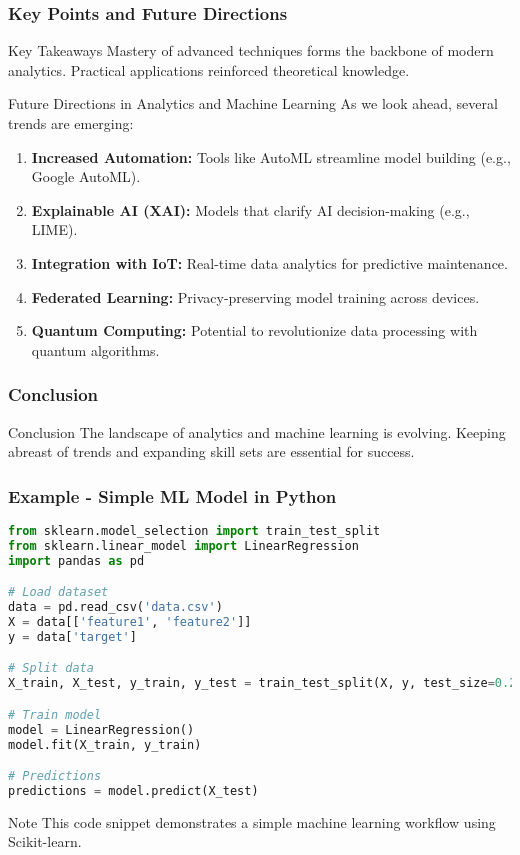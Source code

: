 \documentclass[aspectratio=169]{beamer}
\begin{document}
\begin{frame}[fragile]
    \frametitle{Key Points and Future Directions}
    \begin{block}{Key Takeaways}
        Mastery of advanced techniques forms the backbone of modern analytics.
        \vspace{10pt}
        Practical applications reinforced theoretical knowledge.
    \end{block}
    \begin{block}{Future Directions in Analytics and Machine Learning}
        As we look ahead, several trends are emerging:
    \end{block}
    \begin{enumerate}
        \item \textbf{Increased Automation:} Tools like AutoML streamline model building (e.g., Google AutoML).
        \item \textbf{Explainable AI (XAI):} Models that clarify AI decision-making (e.g., LIME).
        \item \textbf{Integration with IoT:} Real-time data analytics for predictive maintenance.
        \item \textbf{Federated Learning:} Privacy-preserving model training across devices.
        \item \textbf{Quantum Computing:} Potential to revolutionize data processing with quantum algorithms.
    \end{enumerate}
\end{frame}

\begin{frame}
    \frametitle{Conclusion}
    \begin{block}{Conclusion}
        The landscape of analytics and machine learning is evolving. Keeping abreast of trends and expanding skill sets are essential for success.
    \end{block}
\end{frame}

\begin{frame}[fragile]
    \frametitle{Example - Simple ML Model in Python}
    \begin{lstlisting}[language=Python]
from sklearn.model_selection import train_test_split
from sklearn.linear_model import LinearRegression
import pandas as pd

# Load dataset
data = pd.read_csv('data.csv')
X = data[['feature1', 'feature2']]
y = data['target']

# Split data
X_train, X_test, y_train, y_test = train_test_split(X, y, test_size=0.2)

# Train model
model = LinearRegression()
model.fit(X_train, y_train)

# Predictions
predictions = model.predict(X_test)
    \end{lstlisting}
    \begin{block}{Note}
        This code snippet demonstrates a simple machine learning workflow using Scikit-learn.
    \end{block}
\end{frame}
\end{document}
